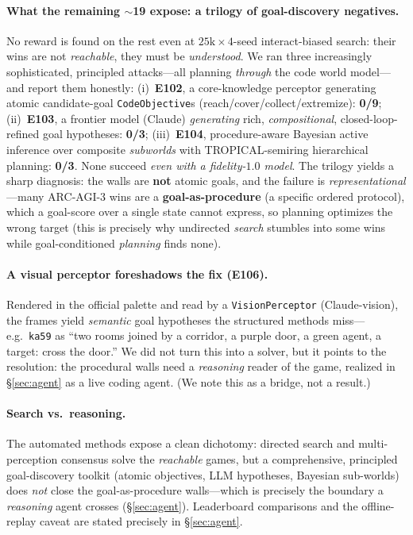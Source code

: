 \documentclass[11pt]{article}
\begin{document}
\paragraph{What the remaining $\sim$19 expose: a trilogy of goal-discovery negatives.}
No reward is found on the rest even at $25\text{k}\times4$-seed interact-biased search: their wins are
not \emph{reachable}, they must be \emph{understood}. We ran three increasingly sophisticated,
principled attacks---all planning \emph{through} the code world model---and report them honestly:
(i)~\textbf{E102}, a core-knowledge perceptor generating atomic candidate-goal \texttt{CodeObjective}s
(reach/cover/collect/extremize): \textbf{0/9}; (ii)~\textbf{E103}, a frontier model (Claude)
\emph{generating} rich, \emph{compositional}, closed-loop-refined goal hypotheses: \textbf{0/3};
(iii)~\textbf{E104}, procedure-aware Bayesian active inference over composite \emph{subworlds} with
TROPICAL-semiring hierarchical planning: \textbf{0/3}. None succeed \emph{even with a fidelity-$1.0$
model}. The trilogy yields a sharp diagnosis: the walls are \textbf{not} atomic goals, and the
failure is \emph{representational}---many ARC-AGI-3 wins are a \textbf{goal-as-procedure} (a specific
ordered protocol), which a goal-score over a single state cannot express, so planning optimizes the
wrong target (this is precisely why undirected \emph{search} stumbles into some wins while
goal-conditioned \emph{planning} finds none).

\paragraph{A visual perceptor foreshadows the fix (E106).} Rendered in the official palette and read
by a \texttt{VisionPerceptor} (Claude-vision), the frames yield \emph{semantic} goal hypotheses the
structured methods miss---e.g.\ \texttt{ka59} as ``two rooms joined by a corridor, a purple door, a
green agent, a target: cross the door.'' We did not turn this into a solver, but it points to the
resolution: the procedural walls need a \emph{reasoning} reader of the game, realized in
\S\ref{sec:agent} as a live coding agent. (We note this as a bridge, not a result.)

\paragraph{Search vs.\ reasoning.} The automated methods expose a clean dichotomy: directed search and
multi-perception consensus solve the \emph{reachable} games, but a comprehensive, principled
goal-discovery toolkit (atomic objectives, LLM hypotheses, Bayesian sub-worlds) does \emph{not} close
the goal-as-procedure walls---which is precisely the boundary a \emph{reasoning} agent crosses
(\S\ref{sec:agent}). Leaderboard comparisons and the offline-replay caveat are stated precisely in
\S\ref{sec:agent}.
\end{document}
